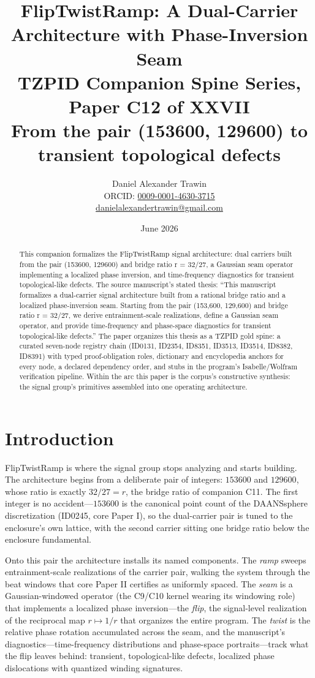 \documentclass[11pt]{article}
\title{FlipTwistRamp: A Dual-Carrier Architecture with Phase-Inversion Seam\\[0.6em]
\large TZPID Companion Spine Series, Paper C12 of XXVII\\
\normalsize From the pair (153600, 129600) to transient topological defects}
\author{Daniel Alexander Trawin\\
\small ORCID: \href{https://orcid.org/0009-0001-4630-3715}{0009-0001-4630-3715}\\
\small \href{mailto:danielalexandertrawin@gmail.com}{danielalexandertrawin@gmail.com}}
\date{June 2026}
\theoremstyle{remark}
\begin{document}
\maketitle

\begin{abstract}
This companion formalizes the FlipTwistRamp signal architecture: dual carriers built from the pair (153600, 129600) and bridge ratio r = 32/27, a Gaussian seam operator implementing a localized phase inversion, and time-frequency diagnostics for transient topological-like defects.
The source manuscript's stated thesis: ``This manuscript formalizes a dual-carrier signal architecture built from a rational bridge ratio and a localized phase-inversion seam. Starting from the pair (153,600, 129,600) and bridge ratio r = 32/27, we derive entrainment-scale realizations, define a Gaussian seam operator, and provide time-frequency and phase-space diagnostics for transient topological-like defects.'' The paper organizes this thesis as a TZPID gold spine: a curated seven-node registry chain (ID0131, ID2354, ID8351, ID3513, ID3514, ID8382, ID8391) with typed proof-obligation roles, dictionary and encyclopedia anchors for every node, a declared dependency order, and stubs in the program's Isabelle/Wolfram verification pipeline. Within the arc this paper is the corpus's constructive synthesis: the signal group's primitives assembled into one operating architecture.
\end{abstract}

\section{Introduction}
\label{sec:intro}

FlipTwistRamp is where the signal group stops analyzing and starts building. The architecture begins from a deliberate pair of integers: $153600$ and $129600$, whose ratio is exactly $32/27 = r$, the bridge ratio of companion C11. The first integer is no accident---$153600$ is the canonical point count of the DAANSsphere discretization (ID0245, core Paper I), so the dual-carrier pair is tuned to the enclosure's own lattice, with the second carrier sitting one bridge ratio below the enclosure fundamental.

Onto this pair the architecture installs its named components. The \emph{ramp} sweeps entrainment-scale realizations of the carrier pair, walking the system through the beat windows that core Paper II certifies as uniformly spaced. The \emph{seam} is a Gaussian-windowed operator (the C9/C10 kernel wearing its windowing role) that implements a localized phase inversion---the \emph{flip}, the signal-level realization of the reciprocal map $r \mapsto 1/r$ that organizes the entire program. The \emph{twist} is the relative phase rotation accumulated across the seam, and the manuscript's diagnostics---time-frequency distributions and phase-space portraits---track what the flip leaves behind: transient, topological-like defects, localized phase dislocations with quantized winding signatures.
\end{document}

